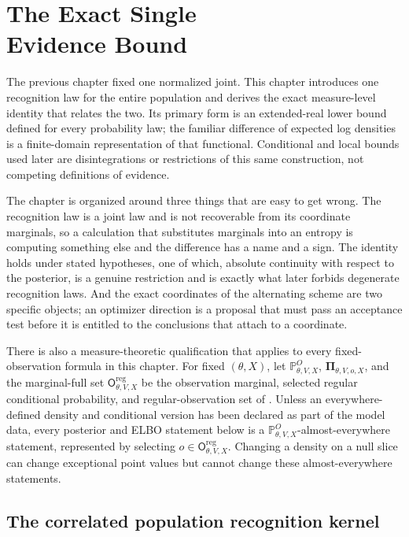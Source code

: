 \chapter[The Exact Single Evidence Bound]{The Exact Single\\Evidence Bound}
\label{ch:elbo}

The previous chapter fixed one normalized joint. This chapter introduces one recognition law for the entire population and derives the exact measure-level identity that relates the two. Its primary form is an extended-real lower bound defined for every probability law; the familiar difference of expected log densities is a finite-domain representation of that functional. Conditional and local bounds used later are disintegrations or restrictions of this same construction, not competing definitions of evidence.

The chapter is organized around three things that are easy to get wrong. The recognition law is a joint law and is not recoverable from its coordinate marginals, so a calculation that substitutes marginals into an entropy is computing something else and the difference has a name and a sign. The identity holds under stated hypotheses, one of which, absolute continuity with respect to the posterior, is a genuine restriction and is exactly what later forbids degenerate recognition laws. And the exact coordinates of the alternating scheme are two specific objects; an optimizer direction is a proposal that must pass an acceptance test before it is entitled to the conclusions that attach to a coordinate.

There is also a measure-theoretic qualification that applies to every fixed-observation formula in this chapter. For fixed $(\theta,X)$, let $\mathbb P_{\theta,V,X}^{O}$, $\boldsymbol\Pi_{\theta,V,o,X}$, and the marginal-full set $\mathsf O_{\theta,V,X}^{\mathrm{reg}}$ be the observation marginal, selected regular conditional probability, and regular-observation set of . Unless an everywhere-defined density and conditional version has been declared as part of the model data, every posterior and ELBO statement below is a $\mathbb P_{\theta,V,X}^{O}$-almost-everywhere statement, represented by selecting $o\in\mathsf O_{\theta,V,X}^{\mathrm{reg}}$. Changing a density on a null slice can change exceptional point values but cannot change these almost-everywhere statements.

\section{The correlated population recognition kernel}
\label{sec:elbo-recognition}

